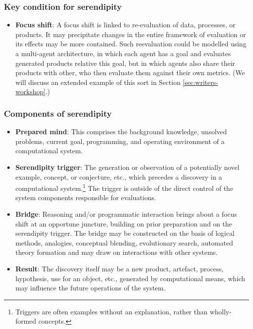 \newpage
\subsubsection*{Key condition for serendipity}

\begin{itemize}
\item \textbf{Focus shift}: A focus shift is linked to re-evaluation
  of data, processes, or products.  It may precipitate changes in the
  entire framework of evaluation or its effects may be more contained.
  Such reevaluation could be modelled using a multi-agent
  architecture, in which each agent has a goal and evaluates generated
  products relative this goal, but in which agents also share their
  products with other, who then evaluate them against their own
  metrics.  (We will discuss an extended example of this sort in
  Section \ref{sec:writers-workshop}.)
\end{itemize}

\subsubsection*{Components of serendipity}

\begin{itemize}
\item \textbf{Prepared mind}: This comprises the background knowledge,
  unsolved problems, current goal, programming, and operating
  environment of a computational system.
\item \textbf{Serendipity trigger}: The generation or observation of a
  potentially novel example, concept, or conjecture, etc., which
  precedes a discovery in a computational system.\footnote{Triggers
    are often examples without an explanation, rather than
    wholly-formed concepts.}  The trigger is outside of the direct
  control of the system components responsible for evaluations.
\item \textbf{Bridge}: Reasoning and/or programmatic interaction
  brings about a focus shift at an opportune juncture, building on
  prior preparation and on the serendipity trigger.  The bridge may be
  constructed on the basis of logical methods, analogies, conceptual
  blending, evolutionary search, automated theory formation and may
  draw on interactions with other systems.
\item \textbf{Result}: The discovery itself may be a new product,
  artefact, process, hypothesis, use for an object, etc., generated by
  computational means, which may influence the future operations of
  the system.
\end{itemize}

